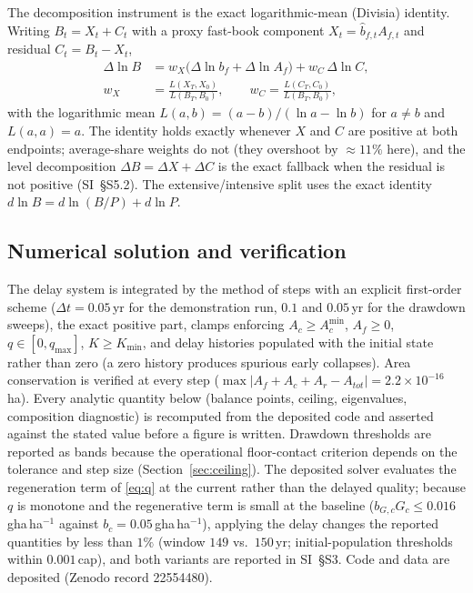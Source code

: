 \documentclass[preprint,12pt,authoryear]{elsarticle}
\newcommand{\Acmin}{A_c^{\min}}
\begin{document}
The decomposition instrument is the exact logarithmic-mean (Divisia) identity. Writing $B_t=X_t+C_t$ with a proxy fast-book component $X_t=\hat b_{f,t}A_{f,t}$ and residual $C_t=B_t-X_t$,
\begin{equation}\label{eq:divisia}
\begin{split}
\Delta\ln B&=w_X\big(\Delta\ln b_f+\Delta\ln A_f\big)+w_C\,\Delta\ln C,\\
w_X&=\frac{L(X_T,X_0)}{L(B_T,B_0)},\qquad w_C=\frac{L(C_T,C_0)}{L(B_T,B_0)},
\end{split}
\end{equation}
with the logarithmic mean $L(a,b)=(a-b)/(\ln a-\ln b)$ for $a\neq b$ and $L(a,a)=a$. The identity holds exactly whenever $X$ and $C$ are positive at both endpoints; average-share weights do not (they overshoot by $\approx11\%$ here), and the level decomposition $\Delta B=\Delta X+\Delta C$ is the exact fallback when the residual is not positive (SI~\S S5.2). The extensive/intensive split uses the exact identity $d\ln B=d\ln(B/P)+d\ln P$.

\subsection{Numerical solution and verification}\label{sec:numerics}

The delay system is integrated by the method of steps with an explicit first-order scheme ($\Delta t=0.05$\,yr for the demonstration run, $0.1$ and $0.05$\,yr for the drawdown sweeps), the exact positive part, clamps enforcing $A_c\ge\Acmin$, $A_f\ge0$, $q\in[0,q_{\max}]$, $K\ge K_{\min}$, and delay histories populated with the initial state rather than zero (a zero history produces spurious early collapses). Area conservation is verified at every step ($\max|A_f+A_c+A_r-A_{tot}|=2.2\times10^{-16}$\,ha). Every analytic quantity below (balance points, ceiling, eigenvalues, composition diagnostic) is recomputed from the deposited code and asserted against the stated value before a figure is written. Drawdown thresholds are reported as bands because the operational floor-contact criterion depends on the tolerance and step size (Section~\ref{sec:ceiling}). The deposited solver evaluates the regeneration term of \eqref{eq:q} at the current rather than the delayed quality; because $q$ is monotone and the regenerative term is small at the baseline ($b_{G,c}G_c\le0.016$\,gha\,ha$^{-1}$ against $b_c=0.05$\,gha\,ha$^{-1}$), applying the delay changes the reported quantities by less than $1\%$ (window $149$ vs.\ $150$\,yr; initial-population thresholds within $0.001$\,cap), and both variants are reported in SI~\S S3. Code and data are deposited (Zenodo record 22554480).
\end{document}
